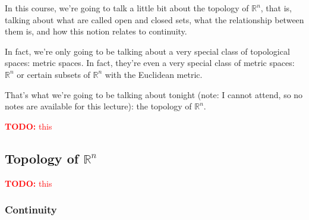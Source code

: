 \documentclass{article}
\newcommand{\reals}[0]{\mathbb{R}}
\newcommand{\TODO}[1]{\textcolor{red}{\textbf{TODO:} #1}}
\begin{document}
In this course, we're going to talk a little bit about the topology of \(\reals^n\), that is, talking about what are called open and closed sets, what the relationship between them is, and how this notion relates to continuity.

In fact, we're only going to be talking about a very special class of topological spaces: metric spaces. In fact, they're even a very special class of metric spaces: \(\reals^n\) or certain subsets of \(\reals^n\) with the Euclidean metric.

That's what we're going to be talking about tonight (note: I cannot attend, so no notes are available for this lecture): the topology of \(\reals^n\).

\TODO{this}

\subsection{Topology of \(\reals^n\)}

\TODO{this}

\subsubsection{Continuity}
\end{document}

